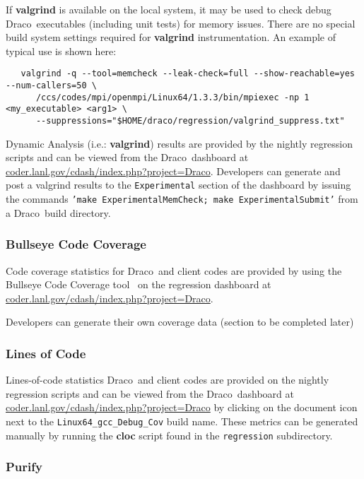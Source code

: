 \documentclass[11pt]{nmemo}
\newcommand{\comp}[1]{\normalfont\footnotesize\texttt{#1}\normalsize}
\newcommand{\draco}{{\normalfont\sffamily Draco}}
\begin{document}
If \textbf{valgrind} is available on the local system, it may be used
to check debug \draco\ executables (including unit tests) for memory
issues. There are no special build system settings required for
\textbf{valgrind} instrumentation.  An example of typical use is shown
here:

\footnotesize
\begin{verbatim}
   valgrind -q --tool=memcheck --leak-check=full --show-reachable=yes --num-callers=50 \
      /ccs/codes/mpi/openmpi/Linux64/1.3.3/bin/mpiexec -np 1 <my_executable> <arg1> \
      --suppressions="$HOME/draco/regression/valgrind_suppress.txt"
\end{verbatim}
\normalsize

Dynamic Analysis (i.e.: \textbf{valgrind}) results are provided by the
nightly regression scripts and can be viewed from the
\draco\ dashboard at
\url{coder.lanl.gov/cdash/index.php?project=Draco}.  Developers can
generate and post a valgrind results to the \comp{Experimental}
section of the dashboard by issuing the commands \comp{'make
  ExperimentalMemCheck; make ExperimentalSubmit'} from a \draco\ build
directory.

\subsubsection{Bullseye Code Coverage}

Code coverage statistics for \draco\ and client codes are provided by
using the Bullseye Code Coverage tool~\cite{bullseyeweb} on the
regression dashboard at
\url{coder.lanl.gov/cdash/index.php?project=Draco}.  

Developers can generate their own coverage data (section to be
completed later)

\subsubsection{Lines of Code}

Lines-of-code statistics \draco\ and client codes are provided on the
nightly regression scripts and can be viewed from the
\draco\ dashboard at
\url{coder.lanl.gov/cdash/index.php?project=Draco} by clicking on the
document icon next to the \comp{Linux64\_gcc\_Debug\_Cov} build
name.  These metrics can be generated manually by running the
\textbf{cloc} script found in the \comp{regression} subdirectory.

\subsubsection{Purify}
\end{document}
